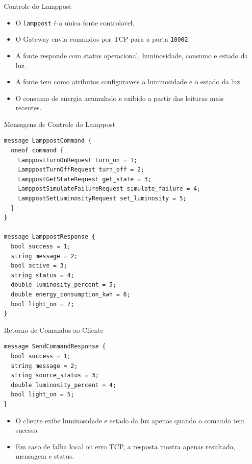 \documentclass[aspectratio=169]{beamer}
\begin{document}
\begin{frame}{Controle do Lamppost}
  \begin{itemize}
    \item O \texttt{lamppost} é a unica fonte controlavel.
    \item O Gateway envia comandos por TCP para a porta \texttt{10002}.
    \item A fonte responde com status operacional, luminosidade, consumo e estado da luz.
    \item A fonte tem como atributos configuraveis a luminosidade e o estado da luz.
    \item O consumo de energia acumulado e exibido a partir das leituras mais recentes.
  \end{itemize}

\end{frame}

\begin{frame}[fragile]{Mensagens de Controle do Lamppost}
\begin{lstlisting}[style=proto]
message LamppostCommand {
  oneof command {
    LamppostTurnOnRequest turn_on = 1;
    LamppostTurnOffRequest turn_off = 2;
    LamppostGetStateRequest get_state = 3;
    LamppostSimulateFailureRequest simulate_failure = 4;
    LamppostSetLuminosityRequest set_luminosity = 5;
  }
}

message LamppostResponse {
  bool success = 1;
  string message = 2;
  bool active = 3;
  string status = 4;
  double luminosity_percent = 5;
  double energy_consumption_kwh = 6;
  bool light_on = 7;
}
\end{lstlisting}
\end{frame}

\begin{frame}[fragile]{Retorno de Comandos ao Cliente}
\begin{lstlisting}[style=proto]
message SendCommandResponse {
  bool success = 1;
  string message = 2;
  string source_status = 3;
  double luminosity_percent = 4;
  bool light_on = 5;
}
\end{lstlisting}

  \begin{itemize}
    \item O cliente exibe luminosidade e estado da luz apenas quando o comando tem sucesso.
    \item Em caso de falha local ou erro TCP, a resposta mostra apenas resultado, mensagem e status.
  \end{itemize}
\end{frame}
\end{document}
